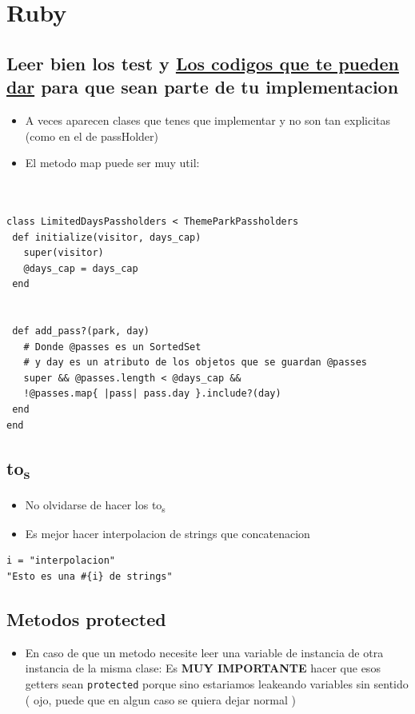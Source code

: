 \documentclass[11pt]{article}
\begin{document}
\section{Ruby}
\label{sec:orgdf982cf}
\subsection{Leer bien los test y \underline{Los codigos que te pueden dar} para que sean parte de tu implementacion}
\label{sec:orgc2c4d0e}
\begin{itemize}
  \item A veces aparecen clases que tenes que implementar y no son tan explicitas (como en el de passHolder)
  \item El metodo map puede ser muy util:
\end{itemize}

\begin{verbatim}


class LimitedDaysPassholders < ThemeParkPassholders
 def initialize(visitor, days_cap)
   super(visitor)
   @days_cap = days_cap
 end


 def add_pass?(park, day)
   # Donde @passes es un SortedSet
   # y day es un atributo de los objetos que se guardan @passes
   super && @passes.length < @days_cap &&
   !@passes.map{ |pass| pass.day }.include?(day)
 end
end

\end{verbatim}
\subsection{to\textsubscript{s}}
\label{sec:org196c29d}
\begin{itemize}
  \item No olvidarse de hacer los to\textsubscript{s}
  \item Es mejor hacer interpolacion de strings que concatenacion
\end{itemize}
\begin{verbatim}
i = "interpolacion"
"Esto es una #{i} de strings"
\end{verbatim}
\subsection{Metodos protected}
\label{sec:orgf2f23bc}
\begin{itemize}
  \item En caso de que un metodo necesite leer una variable de instancia de otra instancia de la misma clase:
    Es \textbf{MUY IMPORTANTE} hacer que esos getters sean \texttt{protected} porque sino estariamos leakeando variables sin sentido ( ojo, puede que en algun caso se quiera dejar normal )
\end{itemize}
\end{document}
